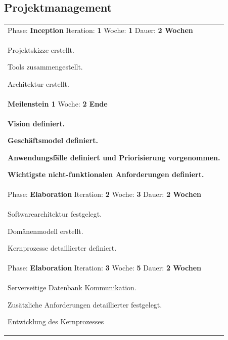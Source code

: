 \documentclass[11pt,ngerman]{article}
\begin{document}
    \subsection{Projektmanagement}
\begin{tabularx}{\textwidth}{X}
	\toprule
	Phase: \textbf{Inception} Iteration: \textbf{1} Woche: \textbf{1} Dauer: \textbf{2 Wochen}\\
	\begin{compactitem}
		\item Projektskizze erstellt.
		\item Tools zusammengestellt.
		\item Architektur erstellt.
	\end{compactitem}\\
	\toprule
	\rowcolor{lightgray}
	\textbf{Meilenstein 1} Woche: \textbf{2 Ende}\\
	\rowcolor{lightgray}
	\begin{compactitem}
		\item \textbf{Vision definiert.}
		\item \textbf{Geschäftsmodel definiert.}
		\item \textbf{Anwendungsfälle definiert und Priorisierung vorgenommen.}
		\item \textbf{Wichtigste nicht-funktionalen Anforderungen definiert.}
	\end{compactitem}\\
	\toprule
	Phase: \textbf{Elaboration} Iteration: \textbf{2} Woche: \textbf{3} Dauer: \textbf{2 Wochen}\\
	\begin{compactitem}
		\item Softwarearchitektur festgelegt.
		\item Domänenmodell erstellt.
		\item Kernprozesse detaillierter definiert.
	\end{compactitem}\\
	\toprule
	Phase: \textbf{Elaboration} Iteration: \textbf{3} Woche: \textbf{5} Dauer: \textbf{2 Wochen}\\
	\begin{compactitem}
		\item Serverseitige Datenbank Kommunikation.
		\item Zusätzliche Anforderungen detaillierter festgelegt.
		\item Entwicklung des Kernprozesses
		

\end{compactitem}
\end{tabularx}
\end{document}
